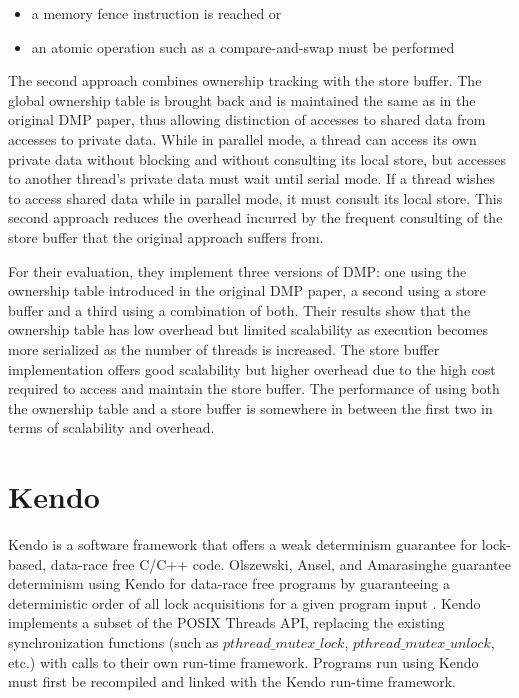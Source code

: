 \begin{itemize}
\item a memory fence instruction is reached or

\item an atomic operation such as a compare-and-swap must be performed
\end{itemize}

The second approach combines ownership tracking with the store buffer.
The global ownership table is brought back and is maintained the same
as in the original DMP paper, thus allowing distinction of accesses to
shared data from accesses to private data.  While in parallel mode, a
thread can access its own private data without blocking and without
consulting its local store, but accesses to another thread's private
data must wait until serial mode.  If a thread wishes to access shared
data while in parallel mode, it must consult its local store.  This
second approach reduces the overhead incurred by the frequent
consulting of the store buffer that the original approach suffers
from.

For their evaluation, they implement three versions of DMP: one using
the ownership table introduced in the original DMP paper, a second
using a store buffer and a third using a combination of both.  Their
results show that the ownership table has low overhead but limited
scalability as execution becomes more serialized as the number of
threads is increased.  The store buffer implementation offers good
scalability but higher overhead due to the high cost required to
access and maintain the store buffer.  The performance of using both
the ownership table and a store buffer is somewhere in between the
first two in terms of scalability and overhead.

\section{Kendo}

Kendo is a software framework that offers a weak determinism guarantee
for lock-based, data-race free C/C++ code.  Olszewski, Ansel, and
Amarasinghe guarantee determinism using Kendo for data-race free
programs by guaranteeing a deterministic order of all lock
acquisitions for a given program input \cite{kendo}.  Kendo implements
a subset of the POSIX Threads API, replacing the existing
synchronization functions (such as $pthread\_mutex\_lock$,
$pthread\_mutex\_unlock$, etc.) with calls to their own run-time
framework.  Programs run using Kendo must first be recompiled and
linked with the Kendo run-time framework.

